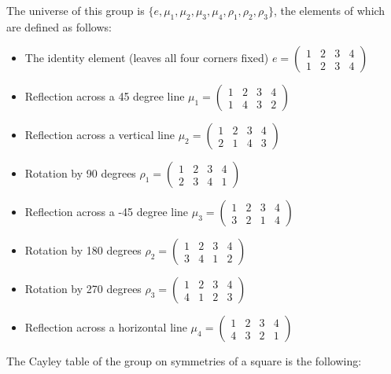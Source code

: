 \documentclass[12pt,reqno]{amsart}
\newcommand{\<}{\ensuremath{\langle}}
\renewcommand{\>}{\ensuremath{\rangle}}
\begin{document}
\begin{enumerate}
The universe of this group is 
$\{e, \mu_1, \mu_2, \mu_3, \mu_4, \rho_1, \rho_2, \rho_3\}$, 
the elements of which are defined as follows:
\begin{itemize}
\item 
The identity element (leaves all four corners fixed)
$e = \begin{pmatrix} 1 & 2 & 3 & 4\\ 1 & 2 & 3 & 4 \end{pmatrix}$
\smallskip
\item Reflection across a 45 degree line
$\mu_1 = \begin{pmatrix}1 & 2 & 3 &4\\1 & 4 & 3 &2\end{pmatrix}$
\smallskip
\item Reflection across a vertical line
$\mu_2 = \begin{pmatrix}1 & 2 & 3 &4\\2 & 1 & 4 &3\end{pmatrix}$
\smallskip
\item Rotation by 90 degrees
$\rho_1 = \begin{pmatrix}1 & 2 & 3 &4\\2 & 3 & 4 &1\end{pmatrix}$
\smallskip
\item Reflection across a -45 degree line
$\mu_3 = \begin{pmatrix}1 & 2 & 3 &4\\3 & 2 & 1 &4\end{pmatrix}$
\smallskip
\item Rotation by 180 degrees
$\rho_2 = \begin{pmatrix}1 & 2 & 3 &4\\3 & 4 & 1 &2\end{pmatrix}$
\smallskip
\item Rotation by 270 degrees
$\rho_3 = \begin{pmatrix}1 & 2 & 3 &4\\4 & 1 & 2 &3\end{pmatrix}$
\smallskip
\item Reflection across a horizontal line
$\mu_4 = \begin{pmatrix}1 & 2 & 3 &4\\4 & 3 & 2 &1\end{pmatrix}$
\end{itemize}


\medskip

\noindent The Cayley table of the group on symmetries of a square is the following:



\end{enumerate}
\end{document}
